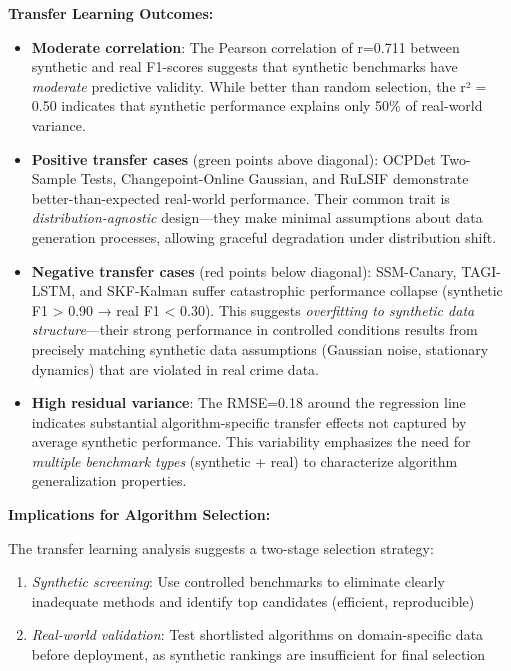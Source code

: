 \textbf{Transfer Learning Outcomes:}

\begin{itemize}
    \item \textbf{Moderate correlation}: The Pearson correlation of r=0.711 between synthetic and real F1-scores suggests that synthetic benchmarks have \textit{moderate} predictive validity. While better than random selection, the r² = 0.50 indicates that synthetic performance explains only 50\% of real-world variance.
    
    \item \textbf{Positive transfer cases} (green points above diagonal): OCPDet Two-Sample Tests, Changepoint-Online Gaussian, and RuLSIF demonstrate better-than-expected real-world performance. Their common trait is \textit{distribution-agnostic} design—they make minimal assumptions about data generation processes, allowing graceful degradation under distribution shift.
    
    \item \textbf{Negative transfer cases} (red points below diagonal): SSM-Canary, TAGI-LSTM, and SKF-Kalman suffer catastrophic performance collapse (synthetic F1 > 0.90 → real F1 < 0.30). This suggests \textit{overfitting to synthetic data structure}—their strong performance in controlled conditions results from precisely matching synthetic data assumptions (Gaussian noise, stationary dynamics) that are violated in real crime data.
    
    \item \textbf{High residual variance}: The RMSE=0.18 around the regression line indicates substantial algorithm-specific transfer effects not captured by average synthetic performance. This variability emphasizes the need for \textit{multiple benchmark types} (synthetic + real) to characterize algorithm generalization properties.
\end{itemize}

\textbf{Implications for Algorithm Selection:}

The transfer learning analysis suggests a two-stage selection strategy:
\begin{enumerate}
    \item \textit{Synthetic screening}: Use controlled benchmarks to eliminate clearly inadequate methods and identify top candidates (efficient, reproducible)
    \item \textit{Real-world validation}: Test shortlisted algorithms on domain-specific data before deployment, as synthetic rankings are insufficient for final selection
\end{enumerate}

